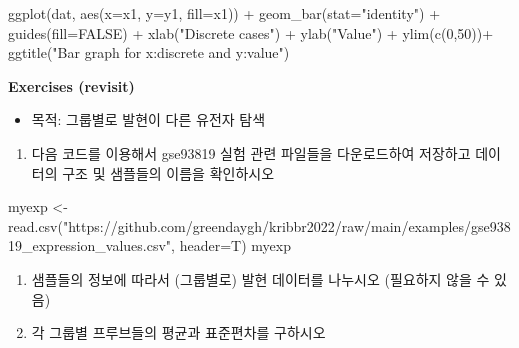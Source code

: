 \documentclass[
]{book}
\newenvironment{Shaded}{\begin{snugshade}}{\end{snugshade}}
\newcommand{\AttributeTok}[1]{\textcolor[rgb]{0.77,0.63,0.00}{#1}}
\newcommand{\ConstantTok}[1]{\textcolor[rgb]{0.00,0.00,0.00}{#1}}
\newcommand{\DecValTok}[1]{\textcolor[rgb]{0.00,0.00,0.81}{#1}}
\newcommand{\FunctionTok}[1]{\textcolor[rgb]{0.00,0.00,0.00}{#1}}
\newcommand{\NormalTok}[1]{#1}
\newcommand{\OtherTok}[1]{\textcolor[rgb]{0.56,0.35,0.01}{#1}}
\newcommand{\SpecialCharTok}[1]{\textcolor[rgb]{0.00,0.00,0.00}{#1}}
\newcommand{\StringTok}[1]{\textcolor[rgb]{0.31,0.60,0.02}{#1}}
\providecommand{\tightlist}{%
  \setlength{\itemsep}{0pt}\setlength{\parskip}{0pt}}
\begin{document}
\begin{Shaded}
\begin{Highlighting}[]
\FunctionTok{ggplot}\NormalTok{(dat, }\FunctionTok{aes}\NormalTok{(}\AttributeTok{x=}\NormalTok{x1, }\AttributeTok{y=}\NormalTok{y1, }\AttributeTok{fill=}\NormalTok{x1)) }\SpecialCharTok{+}
  \FunctionTok{geom\_bar}\NormalTok{(}\AttributeTok{stat=}\StringTok{"identity"}\NormalTok{) }\SpecialCharTok{+}
  \FunctionTok{guides}\NormalTok{(}\AttributeTok{fill=}\ConstantTok{FALSE}\NormalTok{) }\SpecialCharTok{+}
  \FunctionTok{xlab}\NormalTok{(}\StringTok{"Discrete cases"}\NormalTok{) }\SpecialCharTok{+} 
  \FunctionTok{ylab}\NormalTok{(}\StringTok{"Value"}\NormalTok{) }\SpecialCharTok{+}
  \FunctionTok{ylim}\NormalTok{(}\FunctionTok{c}\NormalTok{(}\DecValTok{0}\NormalTok{,}\DecValTok{50}\NormalTok{))}\SpecialCharTok{+}
  \FunctionTok{ggtitle}\NormalTok{(}\StringTok{"Bar graph for x:discrete and y:value"}\NormalTok{)}
\end{Highlighting}
\end{Shaded}

\textbf{Exercises (revisit) }

\begin{itemize}
\tightlist
\item
  목적: 그룹별로 발현이 다른 유전자 탐색
\end{itemize}

\begin{enumerate}
\def\labelenumi{\arabic{enumi}.}
\tightlist
\item
  다음 코드를 이용해서 gse93819 실험 관련 파일들을 다운로드하여 저장하고 데이터의 구조 및 샘플들의 이름을 확인하시오
\end{enumerate}

\begin{Shaded}
\begin{Highlighting}[]
\NormalTok{myexp }\OtherTok{\textless{}{-}} \FunctionTok{read.csv}\NormalTok{(}\StringTok{"https://github.com/greendaygh/kribbr2022/raw/main/examples/gse93819\_expression\_values.csv"}\NormalTok{, }\AttributeTok{header=}\NormalTok{T)}
\NormalTok{myexp}
\end{Highlighting}
\end{Shaded}

\begin{enumerate}
\def\labelenumi{\arabic{enumi}.}
\setcounter{enumi}{1}
\item
  샘플들의 정보에 따라서 (그룹별로) 발현 데이터를 나누시오 (필요하지 않을 수 있음)
\item
  각 그룹별 프루브들의 평균과 표준편차를 구하시오
\end{enumerate}
\end{document}
